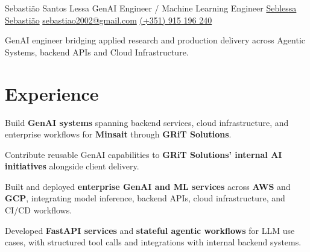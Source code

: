 \documentclass{seb-cv}
\begin{document}
\namesection
{Sebastião}
{Santos Lessa}
{GenAI Engineer / Machine Learning Engineer}
{
  \contactline
    {\href{https://github.com/seblessa}{Seblessa}}
    {\href{https://www.linkedin.com/in/sebastiao-santos-lessa}{Sebastião}}
    {\href{mailto:sebastiao2002@gmail.com}{sebastiao2002@gmail.com}}
    {\href{tel:+351915196240}{(+351) 915 196 240}}
}

\headerbar

\vspace{3pt}
\begin{center}
\fontsize{9.5pt}{12pt}\selectfont
GenAI engineer bridging applied research and production delivery across Agentic Systems, backend APIs and Cloud Infrastructure.
\end{center}
\vspace{-2pt}

\begin{minipage}[t]{0.64\textwidth}

\section{Experience}

\begin{tightemize}
  \item Build \textbf{GenAI systems} spanning backend services, cloud infrastructure, and enterprise workflows for \textbf{Minsait} through \textbf{GRiT Solutions}.
  \item Contribute reusable GenAI capabilities to \textbf{GRiT Solutions' internal AI initiatives} alongside client delivery.
\end{tightemize}

\entrysep

\begin{tightemize}
  \item Built and deployed \textbf{enterprise GenAI and ML services} across \textbf{AWS} and \textbf{GCP}, integrating model inference, backend APIs, cloud infrastructure, and CI/CD workflows.
  \item Developed \textbf{FastAPI services} and \textbf{stateful agentic workflows} for LLM use cases, with structured tool calls and integrations with internal backend systems.
\end{tightemize}


\end{minipage}
\end{document}
